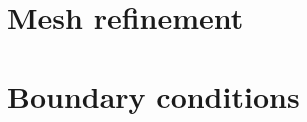 \documentclass[]{report}
\begin{document}
\section{Mesh refinement}


\section{Boundary conditions}

\end{document}
